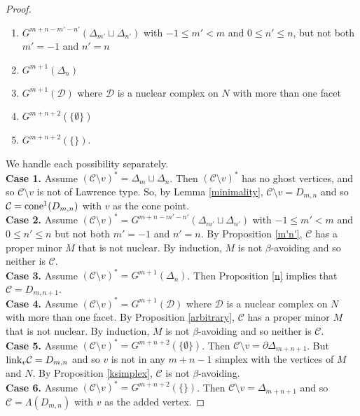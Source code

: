 \documentclass[letterpaper,12pt]{amsart}
\theoremstyle{plain}
\theoremstyle{definition}
\theoremstyle{remark}
\newcommand{\link}{\textnormal{link}}
\newcommand{\cone}{\textnormal{cone}}
\begin{document}
\begin{proof}
\begin{enumerate}
		\item {$G^{m+n-m'-n'}(\Delta_{m'} \sqcup \Delta_{n'})$ with $-1 \le m'< m$ and $0 \le n' \le n$, but not both $m' = -1$ and $n' = n$}
		\item $G^{m+1}(\Delta_{n})$
		\item $G^{m+1}(\mathcal{D})$ where $\mathcal{D}$ is a nuclear complex on $N$ with more than one facet
		\item $G^{m+n+2}(\{\emptyset\})$
		\item $G^{m+n+2}(\{\})$.
	\end{enumerate}
	We handle each possibility separately.
	\\
	\indent
	{\bf Case 1.}  Assume $(\mathcal{C}\setminus v)^* = \Delta_m \sqcup \Delta_n$.
	Then $(\mathcal{C}\setminus v)^*$ has no ghost vertices, and so
	$\mathcal{C}\setminus v$ is not of Lawrence type.
	So, by Lemma \ref{minimality},
	$\mathcal{C} \setminus  v = D_{m,n}$ and so $\mathcal{C} = \cone^1(D_{m,n})$ with $v$ as the cone point.
	\\
	\indent
	{{\bf Case 2.} Assume $(\mathcal{C}\setminus v)^* = G^{m+n-m'-n'}(\Delta_{m'} \sqcup \Delta_{n'})$ with $-1\le m' < m$
	and $0 \le n' \le n$ but not both $m'=-1$ and $n' = n$.
	By Proposition \ref{m'n'}, $\mathcal{C}$ has a proper minor $M$ that is not nuclear.
	By induction, $M$ is not $\beta$-avoiding and so neither is $\mathcal{C}$.}
	\\
	\indent
	{\bf Case 3.} Assume $(\mathcal{C}\setminus v)^* = G^{m+1}(\Delta_n)$.
	Then Proposition \ref{n} implies that $\mathcal{C} = D_{m,n+1}$.
	\\
	\indent
	{\bf Case 4.} Assume $(\mathcal{C}\setminus v)^* = G^{m+1}(\mathcal{D})$ 
	where $\mathcal{D}$ is a nuclear complex on $N$ with more than one facet.
	By Proposition \ref{arbitrary}, $\mathcal{C}$ has a proper minor $M$ that is not nuclear.
	By induction, $M$ is not $\beta$-avoiding and so neither is $\mathcal{C}$.
	\\
	\indent
	{\bf Case 5.} Assume $(\mathcal{C}\setminus v)^* = G^{m+n+2}(\{\emptyset\})$.
	Then $\mathcal{C}\setminus v = \partial\Delta_{m+n+1}$.
	But $\link_v{\mathcal{C}} = D_{m,n}$ and so $v$ is not in any $m+n-1$ simplex with the vertices of $M$ and $N$.
	By Proposition \ref{ksimplex}, $\mathcal{C}$ is not $\beta$-avoiding.
	\\
	\indent
	{\bf Case 6.} Assume $(\mathcal{C}\setminus v)^* = G^{m+n+2}(\{\})$.
	Then $\mathcal{C}\setminus v = \Delta_{m+n+1}$
	and so $\mathcal{C} = \Lambda(D_{m,n})$ with $v$ as the added vertex.
\end{proof}
\end{document}
